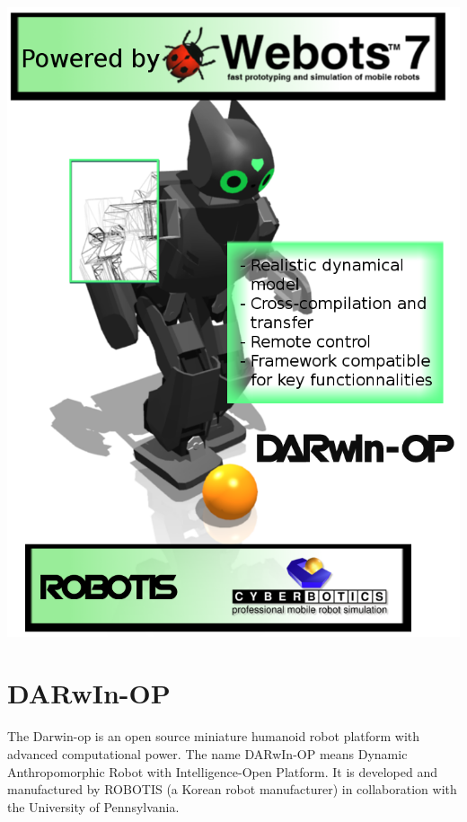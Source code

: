 \documentclass[a4paper, 12pt]{article}  		%
\begin{document}
	

\begin{titlepage}
\begin{center}
\includegraphics[width=17cm]{darwin-op.png}
\end{center}
\end{titlepage}


\begin{spacing}{0.9}
\tableofcontents
\thispagestyle{empty}
\end{spacing}

\newpage
\section{DARwIn-OP}
The Darwin-op is an open source miniature humanoid robot platform with advanced computational power. The name DARwIn-OP means Dynamic Anthropomorphic Robot with Intelligence-Open Platform. It is developed and manufactured by ROBOTIS (a Korean robot manufacturer) in collaboration with the University of Pennsylvania.\\
\end{document}
